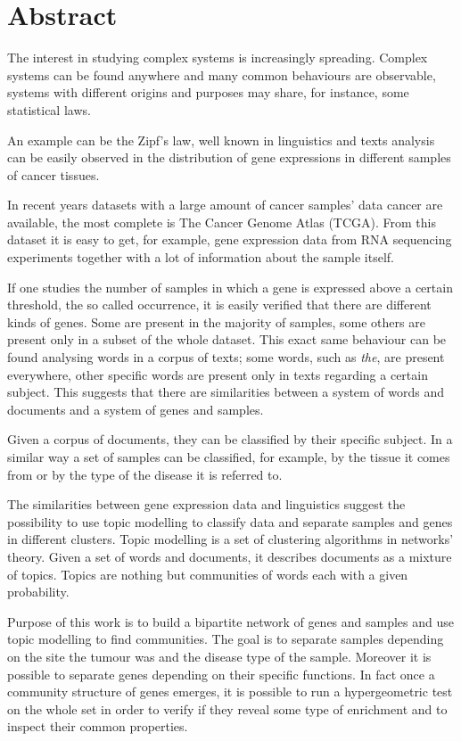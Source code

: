 \chapter*{Abstract}

The interest in studying complex systems is increasingly spreading.
Complex systems can be found anywhere and many common behaviours are observable, systems with different origins and purposes 
may share, for instance, some statistical laws.

An example can be the Zipf's law, well known in linguistics and texts analysis 
can be easily observed in the distribution of gene expressions in different samples of cancer tissues.

In recent years datasets with a large amount of cancer samples' data cancer are available, the most complete is The Cancer Genome Atlas (TCGA).
From this dataset it is easy to get, for example, gene expression data from RNA sequencing experiments 
together with a lot of information about the sample itself.

If one studies the number of samples in which a gene is expressed above a certain threshold, 
the so called occurrence, it is easily verified that there are different kinds of 
genes. Some are present in the majority of samples, some others are present only 
in a subset of the whole dataset. This exact same behaviour can be found analysing words in a corpus of texts; some words, such as \textit{the},
are present everywhere, other specific words are present only in texts regarding a certain subject.
This suggests that there are similarities between a system of words and documents and a system of genes and samples.

Given a corpus of documents, they can be classified by their specific subject. In a similar way a set of samples can be 
classified, for example, by the tissue it comes from or by the type of the disease it is 
referred to.

The similarities between gene expression data and linguistics suggest the possibility to use topic modelling to classify 
data and separate samples and genes in different clusters. Topic modelling is a set of clustering algorithms in networks' theory. 
Given a set of words and documents, it describes documents as a mixture of topics. 
Topics are nothing but communities of words each with a given probability. 

Purpose of this work is to build a bipartite network of genes and samples and use topic modelling to find 
communities. The goal is to separate samples depending on the site the tumour was 
and the disease type of the sample. Moreover it is possible to separate genes depending on their specific functions. 
In fact once a community structure of genes emerges, 
it is possible to run a hypergeometric test on the whole set in order to verify 
if they reveal some type of enrichment and to inspect their common properties.

